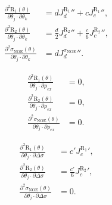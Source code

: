 \documentclass[a4paper,11pt,twoside,openright]{book}
\def\lthtmlcheckvsize{\ifdim\ht\sizebox<\vsize 
  \ifdim\wd\sizebox<\hsize\expandafter\hfill\fi \expandafter\vfill
  \else\expandafter\vss\fi}%
\begin{document}
{\newpage\clearpage
\setcounter{equation}{46}
%
\begin{subequations}\begin{align}
\frac{\partial^2 \mathrm{R}_1(\theta)}{\partial \theta_j \cdot \partial \theta_k} &= d {J_d^{\mathrm{R}_1}}'' + c {J_c^{\mathrm{R}_1}}'',\\
\frac{\partial^2 \mathrm{R}_2(\theta)}{\partial \theta_j \cdot \partial \theta_k} &= \frac{d}{2} {J_d^{\mathrm{R}_2}}'' + \frac{c}{6} {J_c^{\mathrm{R}_2}}'',\\
\frac{\partial^2 \sigma_{\scriptscriptstyle \mathrm{NOE}}(\theta)}{\partial \theta_j \cdot \partial \theta_k} &= d {J_d^{\sigma_{\scriptscriptstyle \mathrm{NOE}}}}''.\end{align}\end{subequations}%
\lthtmldisplayZ
\lthtmlcheckvsize\clearpage}

{\newpage\clearpage
\setcounter{equation}{47}
%
\begin{subequations}\begin{align}
\frac{\partial^2 \mathrm{R}_1(\theta)}{\partial \theta_j \cdot \partial \rho_{ex}} &= 0,\\
\frac{\partial^2 \mathrm{R}_2(\theta)}{\partial \theta_j \cdot \partial \rho_{ex}} &= 0,\\
\frac{\partial^2 \sigma_{\scriptscriptstyle \mathrm{NOE}}(\theta)}{\partial \theta_j \cdot \partial \rho_{ex}} &= 0.\end{align}\end{subequations}%
\lthtmldisplayZ
\lthtmlcheckvsize\clearpage}

{\newpage\clearpage
\setcounter{equation}{48}
%
\begin{subequations}\begin{align}
\frac{\partial^2 \mathrm{R}_1(\theta)}{\partial \theta_j \cdot \partial \Delta\sigma} &= c' {J_c^{\mathrm{R}_1}}',\\
\frac{\partial^2 \mathrm{R}_2(\theta)}{\partial \theta_j \cdot \partial \Delta\sigma} &= \frac{c'}{6} {J_c^{\mathrm{R}_2}}',\\
\frac{\partial^2 \sigma_{\scriptscriptstyle \mathrm{NOE}}(\theta)}{\partial \theta_j \cdot \partial \Delta\sigma} &= 0.\end{align}\end{subequations}%
\lthtmldisplayZ
\lthtmlcheckvsize\clearpage}
\end{document}
